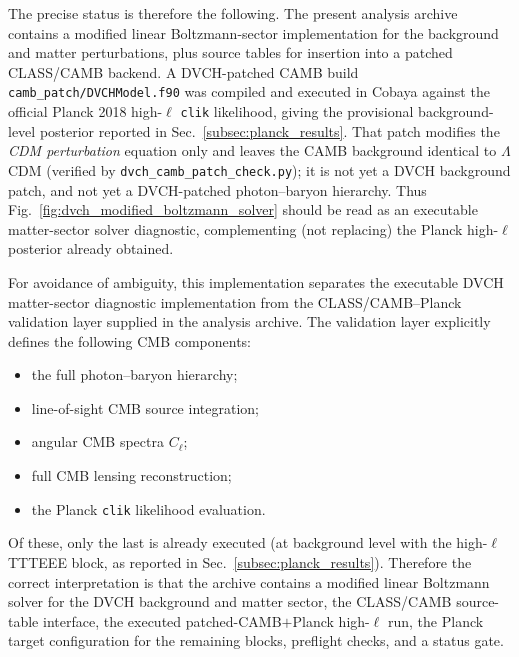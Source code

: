 \documentclass[pdflatex,sn-mathphys-num]{sn-jnl}%
\begin{document}
The precise status is therefore the following. The present analysis archive contains
a modified linear Boltzmann-sector implementation for the background and matter
perturbations, plus source tables for insertion into a patched CLASS/CAMB
backend. A DVCH-patched CAMB build \texttt{camb\_patch/DVCHModel.f90} was
compiled and executed in Cobaya against the official Planck 2018 high-$\ell$
\texttt{clik} likelihood, giving the provisional background-level posterior
reported in Sec.~\ref{subsec:planck_results}. That patch modifies the
\emph{CDM perturbation} equation only and leaves the CAMB background
identical to $\Lambda$CDM (verified by
\texttt{dvch\_camb\_patch\_check.py}); it is not yet a DVCH background
patch, and not yet a DVCH-patched photon--baryon hierarchy.
Thus Fig.~\ref{fig:dvch_modified_boltzmann_solver} should be read as an executable
matter-sector solver diagnostic, complementing (not replacing) the Planck
high-$\ell$ posterior already obtained.


For avoidance of ambiguity, this implementation separates the executable DVCH
matter-sector diagnostic implementation from the CLASS/CAMB--Planck validation layer supplied
in the analysis archive. The validation layer explicitly defines the
following CMB components:
\begin{itemize}
    \item the full photon--baryon hierarchy;
    \item line-of-sight CMB source integration;
    \item angular CMB spectra $C_\ell$;
    \item full CMB lensing reconstruction;
    \item the Planck \texttt{clik} likelihood evaluation.
\end{itemize}
Of these, only the last is already executed (at background level with the
high-$\ell$ TTTEEE block, as reported in
Sec.~\ref{subsec:planck_results}). Therefore the correct interpretation is that
the archive contains a modified linear Boltzmann solver for the DVCH background
and matter sector, the CLASS/CAMB source-table interface, the executed
patched-CAMB$+$Planck high-$\ell$ run, the Planck target configuration for the
remaining blocks, preflight checks, and a status gate.


\begin{center}
\end{center}
\end{document}
